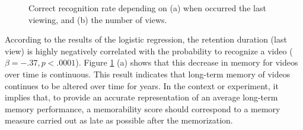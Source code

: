 \documentclass[sigconf]{acmart}
\begin{document}
\begin{figure}[!htbp]
	\centering
	\quad
	\quad
	\caption{\label{fig:logistic_regression}Correct recognition rate depending on (a) when occurred the last viewing, and (b) the number of views.}
\end{figure}

According to the results of the logistic regression, the retention duration (last view) is highly negatively correlated with the probability to recognize a video ($\beta=-.37, p<.0001$).
Figure \ref{fig:logistic_regression} (a) shows that this decrease in memory for videos over time is continuous.
This result indicates that long-term memory of videos continues to be altered over time for years.
In the context or experiment, it implies that, to provide an accurate representation of an average long-term memory performance, a memorability score should correspond to a memory measure carried out as late as possible after the memorization.
\end{document}
